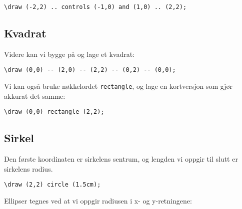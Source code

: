 \documentclass[12pt, a4paper]{article}
\begin{document}
\begin{center}
\end{center}

\begin{Verbatim}[fontsize=\small]
\draw (-2,2) .. controls (-1,0) and (1,0) .. (2,2);
\end{Verbatim}

\newpage

\subsection{Kvadrat}
\noindent Videre kan vi bygge på og lage et kvadrat:
\begin{center}
\end{center}

\begin{Verbatim}[fontsize=\small]
\draw (0,0) -- (2,0) -- (2,2) -- (0,2) -- (0,0);
\end{Verbatim}

Vi kan også bruke nøkkelordet \texttt{rectangle}, og lage en kortversjon som gjør akkurat det samme:
\begin{Verbatim}[fontsize=\small]
\draw (0,0) rectangle (2,2);
\end{Verbatim}

\subsection{Sirkel}
\begin{center}
\end{center}

Den første koordinaten er sirkelens sentrum, og lengden vi oppgir til slutt er sirkelens radius.
\begin{Verbatim}[fontsize=\small]
\draw (2,2) circle (1.5cm);
\end{Verbatim}

\noindent Ellipser tegnes ved at vi oppgir radiusen i x- og y-retningene:
\begin{center}
\end{center}
\end{document}
